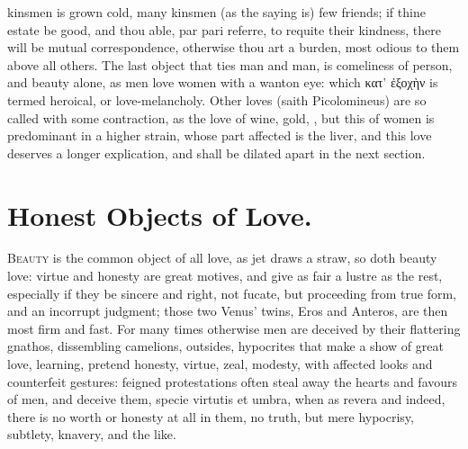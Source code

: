 {kinsmen is grown cold, many kinsmen (as the saying is) few
friends; if thine estate be good, and thou able, par pari referre, to
requite their kindness, there will be mutual correspondence, otherwise
thou art a burden, most odious to them above all others. The last
object that ties man and man, is comeliness of person, and beauty
alone, as men love women with a wanton eye: which κατ' ἐξοχὴν is termed
heroical, or love-melancholy. Other loves (saith Picolomineus) are so
called with some contraction, as the love of wine, gold, \etc{}, but this
of women is predominant in a higher strain, whose part affected is the
liver, and this love deserves a longer explication, and shall be
dilated apart in the next section.

\section{Honest Objects of Love.}

\lettrine{B}{eauty} is the common object of all love, as jet draws a straw, so
doth beauty love: virtue and honesty are great motives, and give as
fair a lustre as the rest, especially if they be sincere and right, not
fucate, but proceeding from true form, and an incorrupt judgment; those
two Venus' twins, Eros and Anteros, are then most firm and fast. For
many times otherwise men are deceived by their flattering gnathos,
dissembling camelions, outsides, hypocrites that make a show of great
love, learning, pretend honesty, virtue, zeal, modesty, with affected
looks and counterfeit gestures: feigned protestations often steal away
the hearts and favours of men, and deceive them, specie virtutis et
umbra, when as revera and indeed, there is no worth or honesty at all
in them, no truth, but mere hypocrisy, subtlety, knavery, and the like.

}
